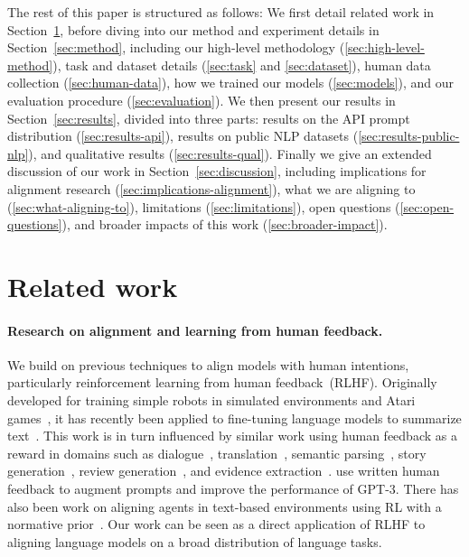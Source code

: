 \documentclass{article}
\begin{document}
The rest of this paper is structured as follows: We first detail related work in Section~\ref{sec:related-work}, before diving into our method and experiment details in Section~\ref{sec:method}, including our high-level methodology (\ref{sec:high-level-method}), task and dataset details (\ref{sec:task} and \ref{sec:dataset}), human data collection (\ref{sec:human-data}), how we trained our models (\ref{sec:models}), and our evaluation procedure (\ref{sec:evaluation}). We then present our results in Section~\ref{sec:results}, divided into three parts: results on the API prompt distribution (\ref{sec:results-api}), results on public NLP datasets (\ref{sec:results-public-nlp}), and qualitative results (\ref{sec:results-qual}). Finally we give an extended discussion of our work in Section~\ref{sec:discussion}, including implications for alignment research (\ref{sec:implications-alignment}), what we are aligning to (\ref{sec:what-aligning-to}), limitations (\ref{sec:limitations}), open questions (\ref{sec:open-questions}), and broader impacts of this work (\ref{sec:broader-impact}).


\section{Related work}
\label{sec:related-work}

\paragraph{Research on alignment and learning from human feedback.} We build on previous techniques to align models with human intentions, particularly reinforcement learning from human feedback~(RLHF). Originally developed for training simple robots in simulated environments and Atari games~\citep{christiano2017deep,ibarz2018reward}, it has recently been applied to fine-tuning language models to summarize text~\citep{ziegler2019fine,stiennon2020learning,bohm2019better,wu2021recursively}. This work is in turn influenced by similar work using human feedback as a reward in domains such as dialogue~\citep{jaques2019way,yi2019towards,hancock2019learning}, translation~\citep{kreutzer2018can,bahdanau2016actor}, semantic parsing~\citep{lawrence2018improving}, story generation~\citep{zhou2020learning}, review generation~\citep{cho2018towards}, and evidence extraction~\citep{perez2019finding}.  \citet{madaan2022memory} use written human feedback to augment prompts and improve the performance of GPT-3. There has also been work on aligning agents in text-based environments using RL with a normative prior~\citep{nahian2021training}. Our work can be seen as a direct application of RLHF to aligning language models on a broad distribution of language tasks. 
\end{document}

